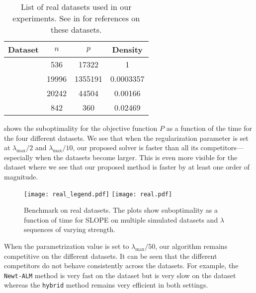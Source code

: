 \begin{table}[hbt]
  \centering
  \caption{%
    List of real datasets used in our experiments.
    See  in  for references on these datasets.
  }
  \label{tab:real-data}
  \begin{tabular}{
      l
      S[table-format=5.0,round-mode=off]
      S[table-format=7.0,round-mode=off]
      S[table-format=1.5,round-mode=figures,round-precision=2]
    }
    \toprule
    Dataset            & {\(n\)} & {\(p\)} & {Density} \\ \midrule
       & 536     & 17322   & 1         \\
       & 19996   & 1355191 & 0.0003357 \\
         & 20242   & 44504   & 0.00166   \\
     & 842     & 360     & 0.02469   \\ \bottomrule
  \end{tabular}
\end{table}

 shows the suboptimality for the objective function $P$ as a function of the time for the four different datasets.
We see that when the regularization parameter is set at $\lambda_{\text{max}}/2$ and $\lambda_{\text{max}}/10$, our proposed solver is faster than all its competitors---especially when the datasets become larger.
This is even more visible for the  dataset where we see that our proposed method is faster by at least one order of magnitude.

\begin{figure*}[!t]
  \centering
  \texttt{[image: real\_legend.pdf]}
  \texttt{[image: real.pdf]}
  \caption{Benchmark on real datasets. The plots show suboptimality as a function of time for SLOPE on multiple simulated datasets and $\lambda$ sequences of varying strength.}
  \label{fig:real-data}
\end{figure*}



When the parametrization value is set to $\lambda_{\text{max}}/50$, our algorithm remains competitive on the different datasets.
It can be seen that the different competitors do not behave consistently across the datasets.
For example, the \texttt{Newt-ALM} method is very fast on the  dataset but is very slow on the  dataset whereas the \texttt{hybrid} method remains very efficient in both settings.
